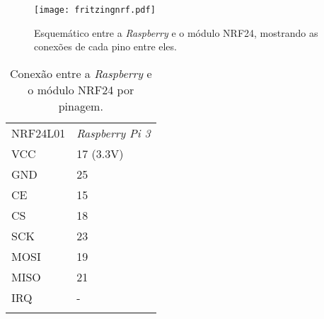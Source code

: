     \begin{figure}[H]
    \centering
    \texttt{[image: fritzingnrf.pdf]}
    \caption{Esquemático entre a \emph{Raspberry} e o módulo NRF24, mostrando as conexões de cada pino entre eles.}
    \label{fritizingnrf}
\end{figure}

    
  \begin{table}[h]
 \centering
 {\renewcommand\arraystretch{1.25}
 \caption{Conexão entre a \emph{Raspberry} e o módulo NRF24 por pinagem.}
 \begin{tabular}{ l l }
  \cline{1-1}\cline{2-2}  
    \multicolumn{1}{|p{3.850cm}|}{NRF24L01 \centering } &
    \multicolumn{1}{p{4.217cm}|}{\emph{Raspberry Pi 3} \centering }
  \\  
  \cline{1-1}\cline{2-2}  
    \multicolumn{1}{|p{3.850cm}|}{VCC \centering } &
    \multicolumn{1}{p{4.217cm}|}{17 (3.3V) \centering }
  \\  
  \cline{1-1}\cline{2-2}  
    \multicolumn{1}{|p{3.850cm}|}{GND \centering } &
    \multicolumn{1}{p{4.217cm}|}{25  \centering }
  \\  
  \cline{1-1}\cline{2-2}  
    \multicolumn{1}{|p{3.850cm}|}{CE \centering } &
    \multicolumn{1}{p{4.217cm}|}{15 \centering }
  \\  
  \cline{1-1}\cline{2-2}  
    \multicolumn{1}{|p{3.850cm}|}{CS \centering } &
    \multicolumn{1}{p{4.217cm}|}{18 \centering }
  \\  
  \cline{1-1}\cline{2-2}  
    \multicolumn{1}{|p{3.850cm}|}{SCK \centering } &
    \multicolumn{1}{p{4.217cm}|}{23 \centering }
  \\  
  \cline{1-1}\cline{2-2}  
    \multicolumn{1}{|p{3.850cm}|}{MOSI \centering } &
    \multicolumn{1}{p{4.217cm}|}{19 \centering }
  \\  
  \cline{1-1}\cline{2-2}  
    \multicolumn{1}{|p{3.850cm}|}{MISO \centering } &
    \multicolumn{1}{p{4.217cm}|}{21 \centering }
  \\  
  \cline{1-1}\cline{2-2}  
    \multicolumn{1}{|p{3.850cm}|}{IRQ \centering } &
    \multicolumn{1}{p{4.217cm}|}{- \centering }
  \\  
  \hline
\label{tabelanrf}
 \end{tabular} }
\end{table}  


